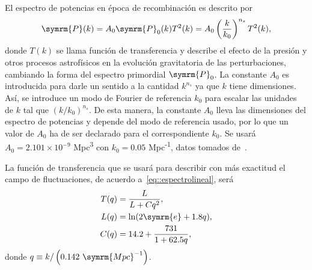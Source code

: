 El espectro de potencias en época de recombinación es descrito por
\begin{equation}
    \symrm{P}(k)=A_0\symrm{P}_0(k)T^2(k)=A_0\left(\frac{k}{k_0}\right)^{n_s}T^2(k),\label{eq::espectrolineal}
\end{equation}
donde \(T(k)\) se llama función de transferencia y describe el efecto de la presión y otros procesos astrofísicos en la evolución gravitatoria de las perturbaciones, cambiando la forma del espectro primordial \(\symrm{P}_0\). La constante \(A_0\) es introducida para darle un sentido a la cantidad \(k^{n_s}\) ya que \(k\) tiene dimensiones. Así, se introduce un modo de Fourier de referencia \(k_0\) para escalar las unidades de \(k\) tal que \(\left(k/k_0\right)^{n_s}\). De esta manera, la constante \(A_0\) lleva las dimensiones del espectro de potencias y depende del modo de referencia usado, por lo que un valor de \(A_0\) ha de ser declarado para el correspondiente \(k_0\). Se usará \(A_0=2.101\times 10^{-9}\) Mpc\textsuperscript{3} con \(k_0=0.05\) Mpc\textsuperscript{-1}, datos tomados de~\cite{collaboration2020planck}.

La función de transferencia que se usará para describir con más     exactitud el campo de fluctuaciones, de acuerdo a~\eqref{eq::espectrolineal}, será~\cite{eisenstein1998baryonic}
\begin{equation}
    \begin{aligned}
        T(q) & =\frac{L}{L+Cq^2},         \\
        L(q) & =\ln(2\symrm{e}+1.8q),     \\
        C(q) & =14.2+\frac{731}{1+62.5q},
    \end{aligned}\label{eq::transff}
\end{equation}
donde \(q\equiv k/\left(0.142\ \symrm{Mpc}^{-1}\right)\).

